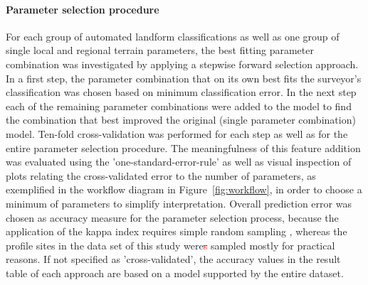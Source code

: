 \documentclass[preprint,12pt,authoryear]{elsarticle}
\begin{document}
\paragraph{Parameter selection procedure} For each group of automated landform classifications as well as one group of single local and regional terrain parameters, the best fitting parameter combination was investigated by applying a stepwise forward selection approach. In a first step, the parameter combination that on its own best fits the surveyor's classification was chosen based on minimum classification error. In the next step each of the remaining parameter combinations were added to the model to find the combination that best improved the original (single parameter combination) model. Ten-fold cross-validation was performed for each step as well as for the entire parameter selection procedure. The meaningfulness of this feature addition was evaluated using the 'one-standard-error-rule' \citep{James2013} as well as visual inspection of plots relating the cross-validated error to the number of parameters, as exemplified in the workflow diagram in Figure~\ref{fig:workflow}, in order to choose a minimum of parameters to simplify interpretation. Overall prediction error was chosen as accuracy measure for the parameter selection process, because the application of the kappa index requires simple random sampling \citep{Congalton1991}, whereas the profile sites in the data set of this study were\textcolor{red}{\sout{s}} sampled mostly for practical reasons. If not specified as 'cross-validated', the accuracy values in the result table of each approach are based on a model supported by the entire dataset. 
\end{document}
